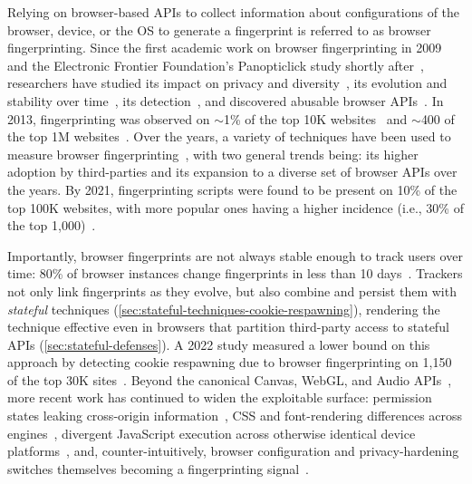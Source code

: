 Relying on browser-based APIs to collect information about configurations of the browser, device, or the OS to generate a fingerprint is referred to as browser fingerprinting.
%
Since the first academic work on browser fingerprinting in 2009~\cite{mayerAnyPersonPamphleteer2009} and the Electronic Frontier Foundation's Panopticlick study shortly after~\cite{eckersleyHowUniqueYour2010}, researchers have studied its impact on privacy and diversity~\cite{laperdrixBeautyBeastDiverting2016,gomez-boixHidingCrowdAnalysis2018}, its evolution and stability over time~\cite{vastelFPSTALKERTrackingBrowser2018}, its detection~\cite{suAutomaticDiscoveryEmerging2023,nomoto2023browser}, and discovered abusable browser APIs~\cite{olejnikLeakingBatteryPrivacy2016,linFashionFauxPas2023,huygheFPRainbowFingerprintBasedBrowser2025}.
%
In 2013, fingerprinting was observed on $\sim$1\% of the top 10K websites~\cite{nikiforakisCookielessMonsterExploring2013} and $\sim$400 of the top 1M websites~\cite{acarFPDetectiveDustingWeb2013}. 
%
Over the years, a variety of techniques have been used to measure browser fingerprinting~\cite{acarWebNeverForgets2014,englehardtOnlineTracking1millionsite2016,olejnikBatteryStatusNot2017,dasWebsSixthSense2018}, with two general trends being: its higher adoption by third-parties and its expansion to a diverse set of browser APIs over the years. 
%
By 2021, fingerprinting scripts were found to be present on 10\% of the top 100K websites, with more popular ones having a higher incidence (i.e., 30\% of the top 1,000)~\cite{iqbalFingerprintingFingerprintersLearning2021,karajWhoTracksMeShedding2019}.


Importantly, browser fingerprints are not always stable enough to track users over time: 80\% of browser instances change fingerprints in less than 10 days~\cite{vastelFPSTALKERTrackingBrowser2018,liWhoTouchedMy2020}.
%
Trackers not only link fingerprints as they evolve, but also combine and persist them with \textit{stateful} techniques (\autoref{sec:stateful-techniques-cookie-respawning}), rendering the technique effective even in browsers that partition third-party access to stateful APIs (\autoref{sec:stateful-defenses}). 
%
A 2022 study measured a lower bound on this approach by detecting cookie respawning due to browser fingerprinting on 1,150 of the top 30K sites~\cite{fouadMyCookiePhoenix2022}.
%
Beyond the canonical Canvas, WebGL, and Audio APIs~\cite{chaliseYourSpeakerMy2022}, more recent work has continued to widen the exploitable surface: permission states leaking cross-origin information~\cite{nomoto2023browser}, CSS and font-rendering differences across engines~\cite{linFashionFauxPas2023}, divergent JavaScript execution across otherwise identical device platforms~\cite{zafarSameScriptDifferent2025}, and, counter-intuitively, browser configuration and privacy-hardening switches themselves becoming a fingerprinting signal~\cite{huygheFPRainbowFingerprintBasedBrowser2025}.



